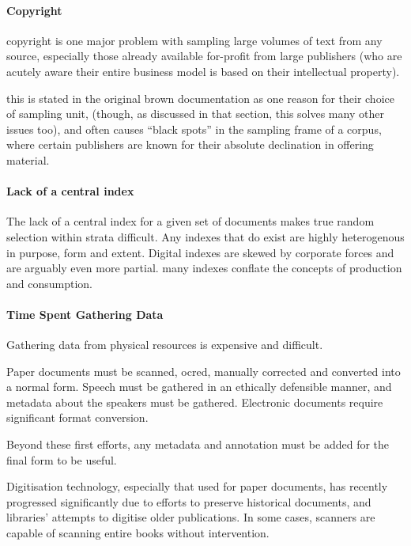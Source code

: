 \paragraph{Copyright}
copyright is one major problem with sampling large volumes of text from any source, especially those already available for-profit from large publishers (who are acutely aware their entire business model is based on their intellectual property).

this is stated in the original brown documentation as one reason for their choice of sampling unit, (though, as discussed in that section, this solves many other issues too), and often causes ``black spots'' in the sampling frame of a corpus, where certain publishers are known for their absolute declination in offering material.


\paragraph{Lack of a central index}
The lack of a central index for a given set of documents makes true random selection within strata difficult. Any indexes that do exist are highly heterogenous in purpose, form and extent. Digital indexes are skewed by corporate forces and are arguably even more partial.  many indexes conflate the concepts of production and consumption.




\paragraph{Time Spent Gathering Data}
Gathering data from physical resources is expensive and difficult.  

Paper documents must be scanned, ocred, manually corrected and converted into a normal form. Speech must be gathered in an ethically defensible manner, and metadata about the speakers must be gathered. Electronic documents require significant format conversion.

Beyond these first efforts, any metadata and annotation must be added for the final form to be useful.

Digitisation technology, especially that used for paper documents, has recently progressed significantly due to efforts to preserve historical documents, and libraries' attempts to digitise older publications. In some cases, scanners are capable of scanning entire books without intervention.





